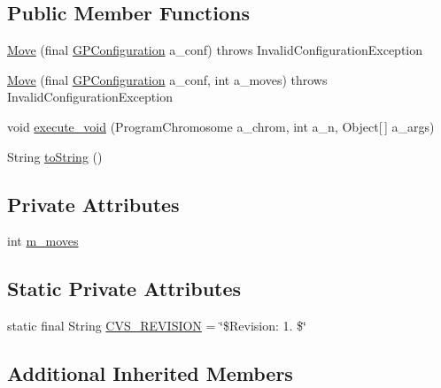 \subsection*{Public Member Functions}
\begin{DoxyCompactItemize}
\item 
\hyperlink{classexamples_1_1gp_1_1anttrail_1_1_move_af0db56e997730f461221c85702a7a0dc}{Move} (final \hyperlink{classorg_1_1jgap_1_1gp_1_1impl_1_1_g_p_configuration}{G\-P\-Configuration} a\-\_\-conf)  throws Invalid\-Configuration\-Exception 
\item 
\hyperlink{classexamples_1_1gp_1_1anttrail_1_1_move_adb378302bc46f156b91053254071e6c7}{Move} (final \hyperlink{classorg_1_1jgap_1_1gp_1_1impl_1_1_g_p_configuration}{G\-P\-Configuration} a\-\_\-conf, int a\-\_\-moves)  throws Invalid\-Configuration\-Exception 
\item 
void \hyperlink{classexamples_1_1gp_1_1anttrail_1_1_move_a591ecfdd2d95b37895cee0d46fdd71d0}{execute\-\_\-void} (Program\-Chromosome a\-\_\-chrom, int a\-\_\-n, Object\mbox{[}$\,$\mbox{]} a\-\_\-args)
\item 
String \hyperlink{classexamples_1_1gp_1_1anttrail_1_1_move_acd07036e55d608f4d172ea10bd9574bc}{to\-String} ()
\end{DoxyCompactItemize}
\subsection*{Private Attributes}
\begin{DoxyCompactItemize}
\item 
int \hyperlink{classexamples_1_1gp_1_1anttrail_1_1_move_aeb46ce59b9a65f47d7941c2fcf59c952}{m\-\_\-moves}
\end{DoxyCompactItemize}
\subsection*{Static Private Attributes}
\begin{DoxyCompactItemize}
\item 
static final String \hyperlink{classexamples_1_1gp_1_1anttrail_1_1_move_a0dddd52bb32e82c48847a723228a8516}{C\-V\-S\-\_\-\-R\-E\-V\-I\-S\-I\-O\-N} = \char`\"{}\$Revision\-: 1. \$\char`\"{}
\end{DoxyCompactItemize}
\subsection*{Additional Inherited Members}


